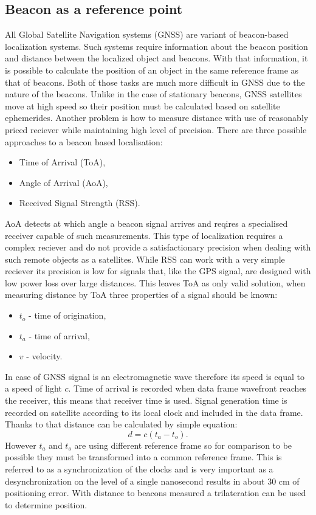 \subsection{Beacon as a reference point}
All Global Satellite Navigation systems (GNSS) are variant of beacon-based localization
systems\cite{Blewitt1997}. Such systems require information about the beacon position
and distance between the localized object and beacons.
With that information, it is possible to calculate the position of an object in the same reference
frame as that of beacons.
Both of those tasks are much more difficult in GNSS due to the nature of the beacons.
Unlike in the case of stationary beacons, GNSS satellites move at high speed so
their position must be calculated based on satellite ephemerides.
Another problem is how to measure distance with use of reasonably priced reciever while 
maintaining high level of precision.
There are three possible approaches to a beacon based localisation:
\begin{itemize}
	\item Time of Arrival (ToA),
	\item Angle of Arrival (AoA),
	\item Received Signal Strength (RSS).
\end{itemize}
AoA detects at which angle a beacon signal arrives and reqires a specialised receiver capable 
of such measurements. This type of localization requires a complex reciever and do not provide 
a satisfactionary precision when dealing with such remote objects as a satellites.
While RSS can work with a very simple reciever its precision is low for signals that, like
the GPS signal, are designed with low power loss over large distances.
This leaves ToA as only valid solution, when measuring distance by ToA 
three properties of a signal should be known:
\begin{itemize}
	\item $t_o$ - time of origination,
	\item $t_a$ - time of arrival,
	\item $v$ - velocity.
\end{itemize}
In case of GNSS signal is an electromagnetic wave therefore its speed is equal
to a speed of light $c$. Time of arrival is recorded when
data frame wavefront reaches the receiver, this means that receiver time is used.
Signal generation time is recorded on satellite according to its local clock and
included in the data frame. Thanks to that distance can be calculated by simple
equation:
\begin{equation}
	d=c(t_a-t_o).
\end{equation}
However $t_a$ and $t_o$ are using different reference frame so for comparison
to be possible they must be transformed into a common reference frame.
This is referred to as a synchronization of the clocks and is very important as
a desynchronization on the level of a single nanosecond results in about 30 cm of
positioning error\cite{Enge2011}.
With distance to beacons measured a trilateration can be used to determine position.


